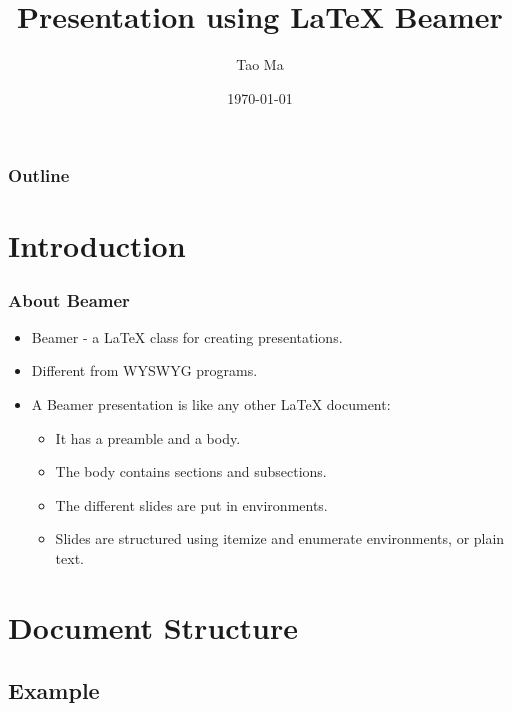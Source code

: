 \documentclass[article]{beamer}
\title{Presentation using \LaTeX{} Beamer}
\author{Tao Ma}
\institute{Electrical and Computer Engineering \\ Auburn University}
\date{\scriptsize{\today}}
\begin{document}

\maketitle


\begin{frame}
\frametitle{Outline}
\tableofcontents
\end{frame}
\section{Introduction}


\begin{frame}[fragile]
\frametitle{About Beamer}
\begin{itemize}
\item  Beamer - a LaTeX class for creating presentations. 
\item  Different from WYSWYG programs. 
\item  A Beamer presentation is like any other LaTeX document:
\begin{itemize}
\item It has a preamble and a body.
\item The body contains sections and subsections. 
\item The different slides are put in environments.
\item Slides are structured using itemize and enumerate environments, or plain text.
\end{itemize} 
\end{itemize}
\end{frame}

\section{Document Structure}
\subsection{Example}


\end{document}

